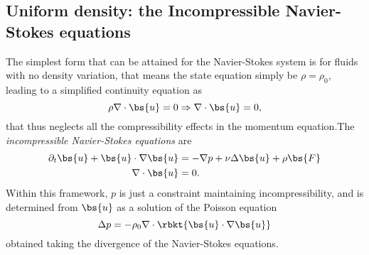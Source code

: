 \subsection{Uniform density: the Incompressible Navier-Stokes equations}
The simplest form that can be attained for the Navier-Stokes system is for fluids with no density variation, that means the state equation simply be $\rho=\rho_{0}$, leading to a simplified continuity equation as
\begin{equation}
    \rho\nabla\cdot\bs{u}=0 \Rightarrow \nabla\cdot\bs{u}=0,
\end{equation}
that thus neglects all the compressibility effects in the momentum equation.The \emph{incompressible Navier-Stokes equations} are
\begin{align}
    \partial_{t}\bs{u} + \bs{u}\cdot\nabla\bs{u} &= -\nabla p + \nu\Delta\bs{u} + \rho\bs{F} \\
    \nabla\cdot\bs{u} &= 0.
\end{align}
Within this framework, $p$ is just a constraint maintaining incompressibility, and is determined from $\bs{u}$ as a solution of the Poisson equation
\begin{equation}
    \Delta p=-\rho_{0}\nabla\cdot\rbkt{\bs{u}\cdot\nabla\bs{u}}
\end{equation}
obtained taking the divergence of the Navier-Stokes equations.

